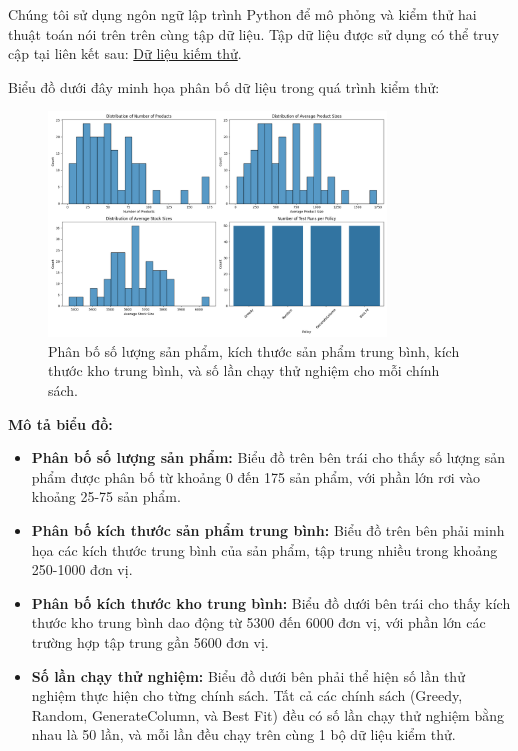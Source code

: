 Chúng tôi sử dụng ngôn ngữ lập trình Python để mô phỏng và kiểm thử hai thuật toán nói trên trên cùng tập dữ liệu. Tập dữ liệu được sử dụng có thể truy cập tại liên kết sau: \href{https://raw.githubusercontent.com/nhan2892005/ReinforcementLearning/refs/heads/main/CSP/results.csv}{Dữ liệu kiếm thử}.

Biểu đồ dưới đây minh họa phân bố dữ liệu trong quá trình kiểm thử:

\begin{figure}[H]
    \centering
    \includegraphics[width=0.8\textwidth]{Images/test_case_distributions.png}
    \caption{Phân bố số lượng sản phẩm, kích thước sản phẩm trung bình, kích thước kho trung bình, và số lần chạy thử nghiệm cho mỗi chính sách.}
    \label{fig:test_distributions}
\end{figure}

\textbf{Mô tả biểu đồ:}
\begin{itemize}
    \item \textbf{Phân bố số lượng sản phẩm:} Biểu đồ trên bên trái cho thấy số lượng sản phẩm được phân bố từ khoảng 0 đến 175 sản phẩm, với phần lớn rơi vào khoảng 25-75 sản phẩm.
    \item \textbf{Phân bố kích thước sản phẩm trung bình:} Biểu đồ trên bên phải minh họa các kích thước trung bình của sản phẩm, tập trung nhiều trong khoảng 250-1000 đơn vị.
    \item \textbf{Phân bố kích thước kho trung bình:} Biểu đồ dưới bên trái cho thấy kích thước kho trung bình dao động từ 5300 đến 6000 đơn vị, với phần lớn các trường hợp tập trung gần 5600 đơn vị.
    \item \textbf{Số lần chạy thử nghiệm:} Biểu đồ dưới bên phải thể hiện số lần thử nghiệm thực hiện cho từng chính sách. Tất cả các chính sách (Greedy, Random, GenerateColumn, và Best Fit) đều có số lần chạy thử nghiệm bằng nhau là 50 lần, và mỗi lần đều chạy trên cùng 1 bộ dữ liệu kiểm thử.
\end{itemize}

